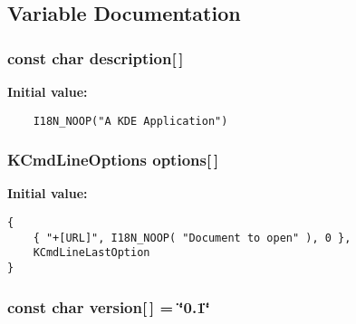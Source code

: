 \subsection{Variable Documentation}
\subsubsection{\setlength{\rightskip}{0pt plus 5cm}const char {\bf description}[$\,$]\hspace{0.3cm}{\tt  [static]}}\label{composer_2main_8cpp_3a610225c9a1967ff50a2803b128c390}


{\bf Initial value:}

\footnotesize\begin{verbatim}
    I18N_NOOP("A KDE Application")
\end{verbatim}\normalsize 
{}
\subsubsection{\setlength{\rightskip}{0pt plus 5cm}KCmd\-Line\-Options {\bf options}[$\,$]\hspace{0.3cm}{\tt  [static]}}\label{composer_2main_8cpp_a044c05d2a52143e85765579e6fc52d8}


{\bf Initial value:}

\footnotesize\begin{verbatim}
{
    { "+[URL]", I18N_NOOP( "Document to open" ), 0 },
    KCmdLineLastOption
}
\end{verbatim}\normalsize 
{}
\subsubsection{\setlength{\rightskip}{0pt plus 5cm}const char {\bf version}[$\,$] = \char`\"{}0.1\char`\"{}\hspace{0.3cm}{\tt  [static]}}\label{composer_2main_8cpp_17c47d085f10696b822db89fa67bda1d}


